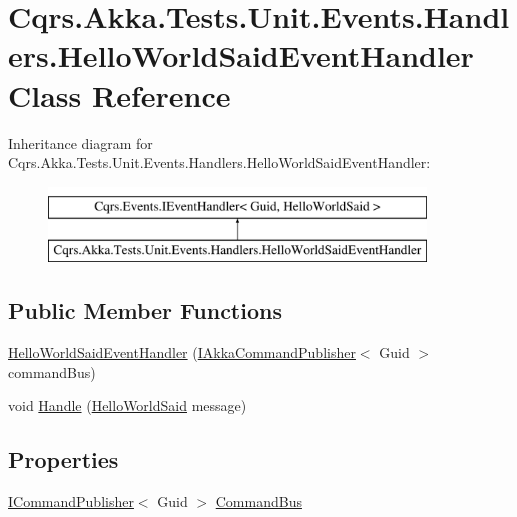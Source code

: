 \hypertarget{classCqrs_1_1Akka_1_1Tests_1_1Unit_1_1Events_1_1Handlers_1_1HelloWorldSaidEventHandler}{}\section{Cqrs.\+Akka.\+Tests.\+Unit.\+Events.\+Handlers.\+Hello\+World\+Said\+Event\+Handler Class Reference}
\label{classCqrs_1_1Akka_1_1Tests_1_1Unit_1_1Events_1_1Handlers_1_1HelloWorldSaidEventHandler}
Inheritance diagram for Cqrs.\+Akka.\+Tests.\+Unit.\+Events.\+Handlers.\+Hello\+World\+Said\+Event\+Handler\+:\begin{figure}[H]
\begin{center}
\leavevmode
\includegraphics[height=2.000000cm]{classCqrs_1_1Akka_1_1Tests_1_1Unit_1_1Events_1_1Handlers_1_1HelloWorldSaidEventHandler}
\end{center}
\end{figure}
\subsection*{Public Member Functions}
\begin{DoxyCompactItemize}
\item 
\hyperlink{classCqrs_1_1Akka_1_1Tests_1_1Unit_1_1Events_1_1Handlers_1_1HelloWorldSaidEventHandler_a8bde891341691d7d73f4cb28f2568335_a8bde891341691d7d73f4cb28f2568335}{Hello\+World\+Said\+Event\+Handler} (\hyperlink{interfaceCqrs_1_1Akka_1_1Commands_1_1IAkkaCommandPublisher}{I\+Akka\+Command\+Publisher}$<$ Guid $>$ command\+Bus)
\item 
void \hyperlink{classCqrs_1_1Akka_1_1Tests_1_1Unit_1_1Events_1_1Handlers_1_1HelloWorldSaidEventHandler_accb924e5856731b18120c21daed0f52a_accb924e5856731b18120c21daed0f52a}{Handle} (\hyperlink{classCqrs_1_1Akka_1_1Tests_1_1Unit_1_1Events_1_1HelloWorldSaid}{Hello\+World\+Said} message)
\end{DoxyCompactItemize}
\subsection*{Properties}
\begin{DoxyCompactItemize}
\item 
\hyperlink{interfaceCqrs_1_1Commands_1_1ICommandPublisher}{I\+Command\+Publisher}$<$ Guid $>$ \hyperlink{classCqrs_1_1Akka_1_1Tests_1_1Unit_1_1Events_1_1Handlers_1_1HelloWorldSaidEventHandler_a67473b7f3dc275d04fe079006da89f6c_a67473b7f3dc275d04fe079006da89f6c}{Command\+Bus}
\end{DoxyCompactItemize}


